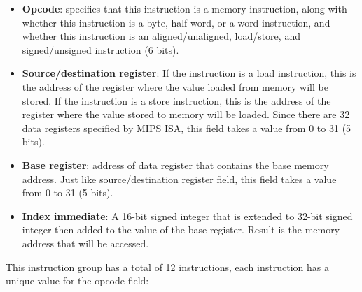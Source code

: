 \documentclass[oneside]{book}
\begin{document}
\begin{itemize}

\item \textbf{Opcode}: specifies that this instruction is a memory
                       instruction, along with whether this instruction
                       is a byte, half-word, or a word instruction, and
                       whether this instruction is an aligned/unaligned,
                       load/store, and signed/unsigned instruction
                       (6 bits).

\item \textbf{Source/destination register}: If the instruction is a load
                                            instruction, this is the address
                                            of the register where the value
                                            loaded from memory will be stored.
                                            If the instruction is a store
                                            instruction, this is the address
                                            of the register where the value
                                            stored to memory will be loaded.
                                            Since there are 32 data registers
                                            specified by MIPS ISA, this field
                                            takes a value from 0 to 31
                                            (5 bits).

\item \textbf{Base register}: address of data register that contains
                              the base memory address. Just like
                              source/destination register field, this
                              field takes a value from 0 to 31 (5 bits).

\item \textbf{Index immediate}: A 16-bit signed integer that is extended to
                                32-bit signed integer then added to the value
                                of the base register. Result is the memory
                                address that will be accessed.

\end{itemize}

This instruction group has a total of 12 instructions, each instruction
has a unique value for the opcode field:
\end{document}
